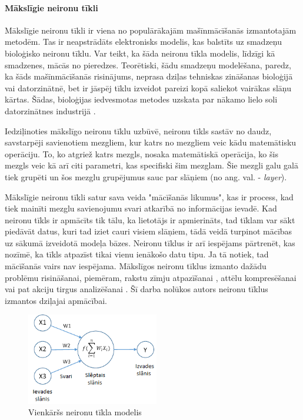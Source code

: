 \paragraph{Mākslīgie neironu tīkli}
\hfill\par
Mākslīgie neironu tīkli ir viena no populārākajām mašīnmācīšanās izmantotajām metodēm. Tas ir neapstrādāts elektronisks modelis, kas balstīts uz smadzeņu bioloģisko neironu tīklu. Var teikt, ka šāda neironu tīkla modelis, līdzīgi kā smadzenes, mācās no pieredzes. Teorētiski, šādu smadzeņu modelēšana, paredz, ka šāds mašīnmācīšanās risinājums, neprasa dziļas tehniskas zināšanas bioloģijā vai datorzinātnē, bet ir jāspēj tīklu izveidot pareizi kopā saliekot vairākas slāņu kārtas. Šādas, bioloģijas iedvesmotas metodes uzskata par nākamo lielo soli datorzinātnes industrijā \cite{staff}. \par
Iedziļinoties mākslīgo neironu tīklu uzbūvē, neironu tīkls sastāv no daudz, savstarpēji savienotiem mezgliem, kur katrs no mezgliem veic kādu matemātisku operāciju. To, ko atgriež katrs mezgls, nosaka matemātiskā operācija, ko šis mezgls veic kā arī citi parametri, kas specifiski šim mezglam. Šie mezgli galu galā tiek grupēti un šos mezglu grupējumus sauc par slāņiem (no ang. val. - \textit{layer}). \par
Mākslīgie neironu tīkli satur sava veida "mācīšanās likumus", kas ir process, kad tiek mainīti mezglu savienojumu svari atkarībā no informācijas ievadē. 
Kad neironu tīkls ir apmācīts tik tālu, ka lietotājs ir apmierināts, tad tīklam var sākt piedāvāt datus, kuri tad iziet cauri visiem slāņiem, tādā veidā turpinot mācības uz sākumā izveidotā modeļa bāzes. Neironu tīklus ir arī iespējams pārtrenēt, kas nozīmē, ka tīkls atpazīst tikai vienu ienākošo datu tipu. Ja tā notiek, tad mācīšanās vairs nav iespējama. Mākslīgos neironu tīklus izmanto dažādu problēmu risināšanai, piemēram, rakstu zīmju atpazīšanai \cite{nnchars}, attēlu kompresēšanai \cite{dony1995neural} vai pat akciju tirgus analizēšanai \cite{kimoto1990stock}. Šī darba nolūkos autors neironu tīklus izmantos dziļajai apmācībai.

\begin{figure}[h]%
	\centering
	\includegraphics[height=4cm]{images/neironutikls.png} %
	\caption{Vienkāršs neironu tīkla modelis}%
	\label{fig:example}%
\end{figure}
